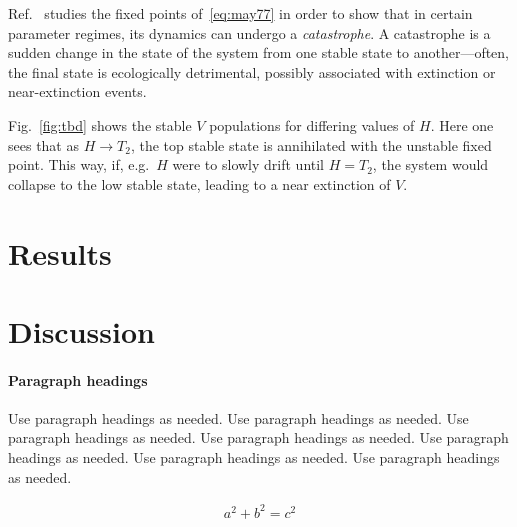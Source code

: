 \documentclass[smallextended]{svjour3}       %
\begin{document}
Ref.~\cite{may77} studies the fixed points of~\eqref{eq:may77} in order to show that in certain parameter regimes, its dynamics can undergo a \emph{catastrophe}.
A catastrophe is a sudden change in the state of the system from one stable state to another---often, the final state is ecologically detrimental, possibly associated with extinction or near-extinction events.

Fig.~\ref{fig:tbd} shows the stable $V$ populations for differing values of $H$. 
Here one sees that as $H\to T_2$, the top stable state is annihilated with the unstable fixed point.
This way, if, e.g.\ $H$ were to slowly drift until $H=T_2$, the system would collapse to the low stable state, leading to a near extinction of $V$.



\hypertarget{sec:5}{%
\section{Results}\label{sec:results}}

\hypertarget{sec:6}{%
\section{Discussion}\label{sec:discussion}}




\hypertarget{paragraph-headings}{%
\paragraph{Paragraph headings}\label{paragraph-headings}}

Use paragraph headings as needed. 
Use paragraph headings as needed. 
Use paragraph headings as needed. 
Use paragraph headings as needed. 
Use paragraph headings as needed. 
Use paragraph headings as needed. 
Use paragraph headings as needed. 

\begin{align}
a^2+b^2=c^2
\end{align}




\end{document}
